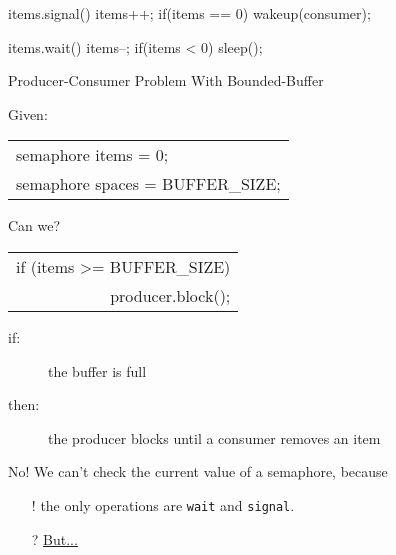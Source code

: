 \begin{minipage}{.4\linewidth}
\begin{ccode}
  items.signal()
  {
    items++;
    if(items == 0)
      wakeup(consumer);
  }  
\end{ccode} 
\end{minipage}
\qquad\qquad
\begin{minipage}{.4\linewidth}
\begin{ccode}
  items.wait()
  {
    items--;
    if(items < 0)
      sleep();
  }
\end{ccode} 
\end{minipage}

\begin{frame}{Producer-Consumer Problem With Bounded-Buffer}
  \begin{block}{Given:}
    \begin{center}
      \begin{tabular}{>{\ttfamily}l}
        semaphore items = 0;\\
        semaphore spaces = BUFFER\_SIZE;
      \end{tabular}
    \end{center}
  \end{block}
  \begin{block}{Can we?}
    \begin{center}
      \begin{tabular}{>{\ttfamily}r}
        if (items >= BUFFER\_SIZE)\\
        producer.block();
      \end{tabular}
    \end{center}
    \begin{description}
    \item[if:] the buffer is full
    \item[then:] the producer blocks until a consumer removes an item
    \end{description}
  \end{block}
  \pause 
  \alert{No!} We can't check the current value of a semaphore, because
  \begin{itemize}
  \item[!] \alert{the only operations are \texttt{wait} and \texttt{signal}}.
  \item[?] \hyperlink{comp}{But...}
  \end{itemize}
\end{frame}

